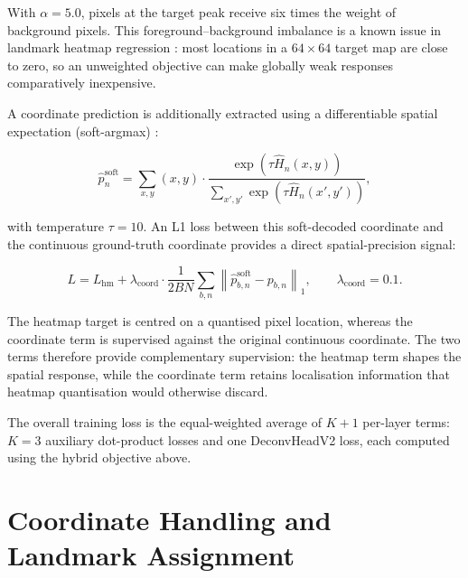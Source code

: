 With $\alpha=5.0$, pixels at the target peak receive six times the
weight of background pixels. This foreground--background imbalance is
a known issue in landmark heatmap regression
\parencite{wang2019awing}: most locations in a $64\times64$ target
map are close to zero, so an unweighted objective can make globally
weak responses comparatively inexpensive.

A coordinate prediction is additionally extracted using a
differentiable spatial expectation (soft-argmax)
\parencite{sun2018integral}:

\begin{equation}
  \label{eq:soft-argmax}
  \hat{p}_n^{\text{soft}}
  =
  \sum_{x,y}
  (x,y)
  \cdot
  \frac{
    \exp(\tau\hat{H}_n(x,y))
  }{
    \sum_{x',y'}
    \exp(\tau\hat{H}_n(x',y'))
  },
\end{equation}

with temperature $\tau=10$. An L1 loss between this soft-decoded
coordinate and the continuous ground-truth coordinate provides a
direct spatial-precision signal:

\begin{equation}
  \label{eq:hybrid-loss}
  L
  =
  L_{\text{hm}}
  +
  \lambda_{\text{coord}}
  \cdot
  \frac{1}{2BN}
  \sum_{b,n}
  \left\lVert
    \hat{p}_{b,n}^{\text{soft}}
    -
    p_{b,n}
  \right\rVert_1,
  \qquad
  \lambda_{\text{coord}}=0.1 .
\end{equation}

The heatmap target is centred on a quantised pixel location, whereas
the coordinate term is supervised against the original continuous
coordinate. The two terms therefore provide complementary
supervision: the heatmap term shapes the spatial response, while the
coordinate term retains localisation information that heatmap
quantisation would otherwise discard.

The overall training loss is the equal-weighted average of $K+1$
per-layer terms: $K=3$ auxiliary dot-product losses and one
DeconvHeadV2 loss, each computed using the hybrid objective above.



\section{Coordinate Handling and Landmark Assignment}
\label{sec:method-coordinates}


